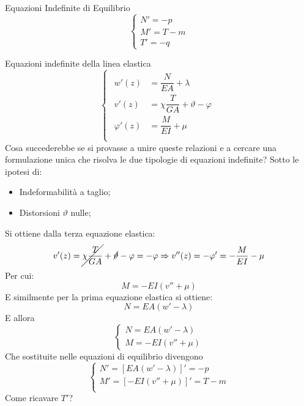 \documentclass{article}
\begin{document}
\begin{adjustwidth}{2in}{}
		
		Equazioni Indefinite di Equilibrio
		\[
		\begin{cases}
				N'= -p \\
				M'= T - m \\
				T' = -q
		\end{cases}
		\]
		
		Equazioni indefinite della linea elastica
		\[
		\begin{cases}
			\begin{aligned}
				w'(z) & =   \dfrac{N}{EA} + \lambda \\
				v'(z) & = \chi\dfrac{T}{GA} +\vartheta- \varphi \\
				\varphi'(z) & =  \dfrac{M}{EI} + \mu \\
			\end{aligned}	
		\end{cases}
		\]
		Cosa succederebbe se si provasse a unire queste relazioni e a cercare una formulazione unica che risolva le due tipologie di equazioni indefinite? \newline
		Sotto le ipotesi di:
		
	\begin{itemize}
		\item Indeformabilità a taglio;
		
		\item Distorsioni $\vartheta$ nulle; 
	\end{itemize}
		
		Si ottiene dalla terza equazione elastica:
		\[	v'(z) = \cancel{\chi\dfrac{T}{GA}} +\cancel{\vartheta}- \varphi = -\varphi \Rightarrow v''(z)  = -\varphi' = -\dfrac{M}{EI} - \mu \] 
		Per cui:
		\[M = -EI(v'' +\mu)\] 
		E similmente per la prima equazione elastica si ottiene:
		\[N = EA(w'-\lambda)\]
		E allora 
		\[\begin{cases}
			N = EA(w'-\lambda) \\
			M = -EI(v'' +\mu) 
		\end{cases}\] 
		Che sostituite nelle equazioni di equilibrio divengono
		\[
		\begin{cases}
			N'= [EA(w'-\lambda)]'= -p \\
			M'= [-EI(v'' +\mu)]'= T - m \\
		\end{cases}
		\]
		Come ricavare $T'$? \newline 
		

\end{adjustwidth}
\end{document}
